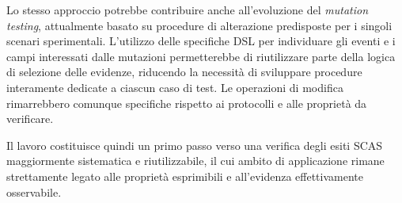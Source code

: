 Lo stesso approccio potrebbe contribuire anche all'evoluzione del \emph{mutation testing}, attualmente basato su procedure di alterazione predisposte per i singoli scenari sperimentali. L'utilizzo delle specifiche DSL per individuare gli eventi e i campi interessati dalle mutazioni permetterebbe di riutilizzare parte della logica di selezione delle evidenze, riducendo la necessità di sviluppare procedure interamente dedicate a ciascun caso di test. Le operazioni di modifica rimarrebbero comunque specifiche rispetto ai protocolli e alle proprietà da verificare.

Il lavoro costituisce quindi un primo passo verso una verifica degli esiti SCAS maggiormente sistematica e riutilizzabile, il cui ambito di applicazione rimane strettamente legato alle proprietà esprimibili e all'evidenza effettivamente osservabile.
